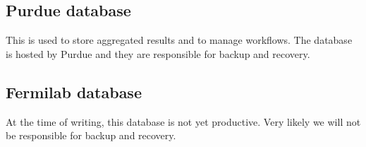 \documentclass[12pt]{unlsilabsop}
\begin{document}
\subsection{Purdue database}
This is used to store aggregated results and to manage workflows. The database is hosted by Purdue and they are responsible for backup and recovery.

\subsection{Fermilab database}
At the time of writing, this database is not yet productive. Very likely we will not be responsible for backup and recovery.
\end{document}
